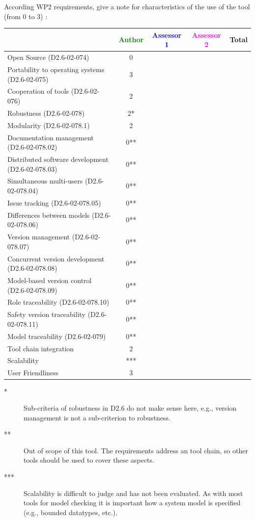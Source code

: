 According WP2 requirements, give a note for characteristics of the use of the tool (from 0 to 3) :

\begin{tabular}{|l | c | c | c | c|}
\hline
& \textcolor{green}{Author} & \textcolor{blue}{Assessor 1} & \textcolor{magenta}{Assessor 2} & Total \\
\hline 
Open Source (D2.6-02-074) &0 & & &  \\
\hline 
Portability to operating systems (D2.6-02-075) &3 & & &  \\
\hline
Cooperation of tools (D2.6-02-076) &2 & & &  \\
\hline
Robustness (D2.6-02-078) &2* & & & \\
\hline
Modularity (D2.6-02-078.1) &2 & & & \\
\hline
Documentation management (D2.6-02-078.02) &0** & & & \\
\hline
Distributed software development (D2.6-02-078.03)  &0** & & & \\
\hline
Simultaneous multi-users (D2.6-02-078.04)   &0** & & & \\
\hline
Issue tracking (D2.6-02-078.05) &0** & & & \\
\hline
Differences between models (D2.6-02-078.06) &0** & & & \\
\hline
Version management (D2.6-02-078.07) &0** & & & \\
\hline
Concurrent version development (D2.6-02-078.08) &0** & & & \\
\hline
Model-based version control (D2.6-02-078.09) &0** & & & \\
\hline
Role traceability (D2.6-02-078.10) &0** & & & \\
\hline
Safety version traceability (D2.6-02-078.11) &0** & & & \\
\hline
Model traceability (D2.6-02-079) &0** & & & \\
\hline
Tool chain integration &2 & & & \\
\hline
Scalability &*** & & & \\
\hline
User Friendliness &3& & & \\
\hline
\end{tabular}

\begin{author_comment}
\begin{description}
\item[*] Sub-criteria of robustness in D2.6 do not make sense here, e.g., version management is not a sub-criterion to robustness.
\item[**] Out of scope of this tool. The requirements address an tool chain, so other tools should be used to cover these aspects.
\item[***] Scalability is difficult to judge and has not been evaluated. As with most tools for model checking it is important how a system model is specified (e.g., bounded datatypes, etc.).
\end{description}
\end{author_comment}


